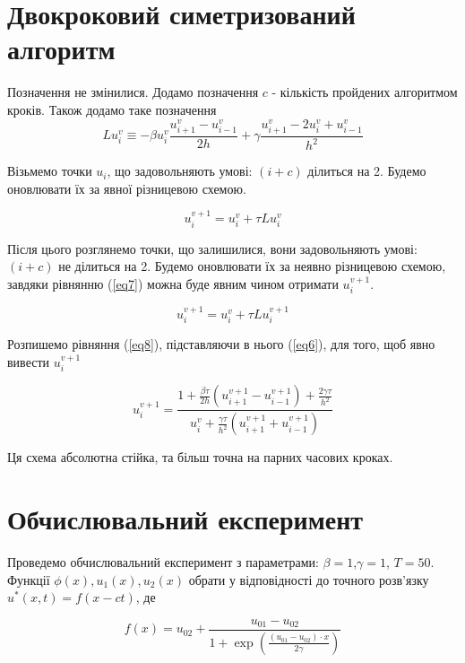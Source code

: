 \documentclass[a4paper,12pt]{article}
\begin{document}
\section{Двокроковий симетризований алгоритм}

Позначення не змінилися. Додамо позначення $c$ - кількість пройдених алгоритмом кроків. Також додамо таке позначення
\begin{equation} \label{eq6}
		L u_{i}^{v} \equiv - \beta u_{i}^{v} \frac{u_{i+1}^{v} - u_{i-1}^{v}}{2h} + \gamma \frac{u_{i+1}^{v} - 2u_{i}^{v} +u_{i-1}^{v}}{h^2}
\end{equation}

Візьмемо точки $u_{i}$, що задовольняють умові: $(i+c)$ ділиться на 2. Будемо оновлювати їх за явної різницевою схемою.

\begin{equation} \label{eq7}
	u_i^{v+1}= u_i^{v} + \tau Lu_{i}^{v}
\end{equation}

Після цього розглянемо точки, що залишилися, вони задовольняють умові: $(i+c)$ не ділиться на 2. Будемо оновлювати їх за неявно різницевою схемою, завдяки рівнянню (\ref{eq7}) можна буде явним чином отримати $u_{i}^{v+1}$.

\begin{equation} \label{eq8}
u_i^{v+1}= u_i^{v} + \tau Lu_{i}^{v+1}
\end{equation}

Розпишемо рівняння (\ref{eq8}), підставляючи в нього (\ref{eq6}), для того, щоб явно вивести $u_i^{v+1}$

\begin{equation} \label{eq9}
	u^{v+1}_{i} = \frac{1 + \frac{\beta \tau}{2h} \left( u^{v+1}_{i+1} - u^{v+1}_{i-1} \right) + \frac{2 \gamma \tau}{h^2} }{u_i^v + \frac{\gamma \tau}{h^2} \left( u^{v+1}_{i+1} + u^{v+1}_{i-1} \right) }
\end{equation}

Ця схема абсолютна стійка, та більш точна на парних часових кроках.

\section{Обчислювальний експеримент}

Проведемо обчислювальний експеримент з параметрами: $\beta = 1$,$\gamma=1$, $T = 50$. Функції $\phi(x), u_1(x), u_2(x)$ обрати у відповідності до точного розв'язку $u^*(x,t) = f(x - ct)$, де 

\begin{equation} \label{eq10}
	f(x) = u_{02} + \frac{u_{01} - u_{02}}{1 + \exp\left(\frac{(u_{01}-u_{02})\cdot x }{2\gamma} \right)}
\end{equation}
\end{document}
